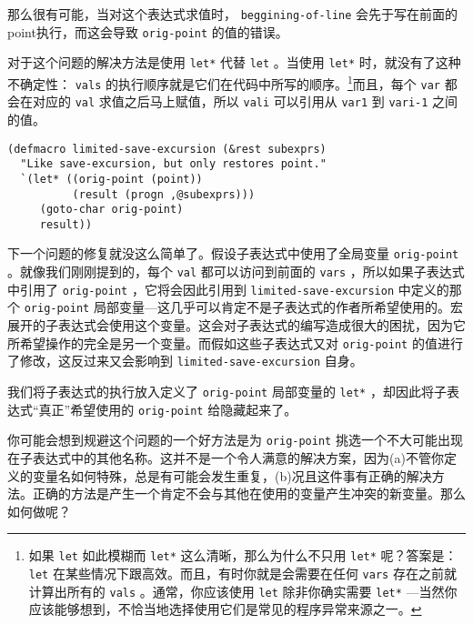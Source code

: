 那么很有可能，当对这个表达式求值时， \texttt{beggining-of-line} 会先于写在前面的point执行，而这会导致 \texttt{orig-point} 的值的错误。

对于这个问题的解决方法是使用 \texttt{let*} 代替 \texttt{let} 。当使用 \texttt{let*} 时，就没有了这种不确定性： \texttt{vals} 的执行顺序就是它们在代码中所写的顺序。\footnote{如果 \texttt{let} 如此模糊而 \texttt{let*} 这么清晰，那么为什么不只用 \texttt{let*} 呢？答案是： \texttt{let} 在某些情况下跟高效。而且，有时你就是会需要在任何 \texttt{vars} 存在之前就计算出所有的 \texttt{vals} 。通常，你应该使用 \texttt{let} 除非你确实需要 \texttt{let*} ---当然你应该能够想到，不恰当地选择使用它们是常见的程序异常来源之一。}而且，每个 \texttt{var} 都会在对应的 \texttt{val} 求值之后马上赋值，所以 \texttt{vali} 可以引用从 \texttt{var1} 到 \texttt{vari-1} 之间的值。

\begin{verbatim}
(defmacro limited-save-excursion (&rest subexprs)
  "Like save-excursion, but only restores point."
  `(let* ((orig-point (point))
          (result (progn ,@subexprs)))
     (goto-char orig-point)
     result))
\end{verbatim}

下一个问题的修复就没这么简单了。假设子表达式中使用了全局变量 \texttt{orig-point} 。就像我们刚刚提到的，每个 \texttt{val} 都可以访问到前面的 \texttt{vars} ，所以如果子表达式中引用了 \texttt{orig-point} ，它将会因此引用到 \texttt{limited-save-excursion} 中定义的那个 \texttt{orig-point} 局部变量---这几乎可以肯定不是子表达式的作者所希望使用的。宏展开的子表达式会使用这个变量。这会对子表达式的编写造成很大的困扰，因为它所希望操作的完全是另一个变量。而假如这些子表达式又对 \texttt{orig-point} 的值进行了修改，这反过来又会影响到 \texttt{limited-save-excursion} 自身。

我们将子表达式的执行放入定义了 \texttt{orig-point} 局部变量的 \texttt{let*} ，却因此将子表达式“真正”希望使用的 \texttt{orig-point} 给隐藏起来了。

你可能会想到规避这个问题的一个好方法是为 \texttt{orig-point} 挑选一个不大可能出现在子表达式中的其他名称。这并不是一个令人满意的解决方案，因为(a)不管你定义的变量名如何特殊，总是有可能会发生重复，(b)况且这件事有正确的解决方法。正确的方法是产生一个肯定不会与其他在使用的变量产生冲突的新变量。那么如何做呢？

